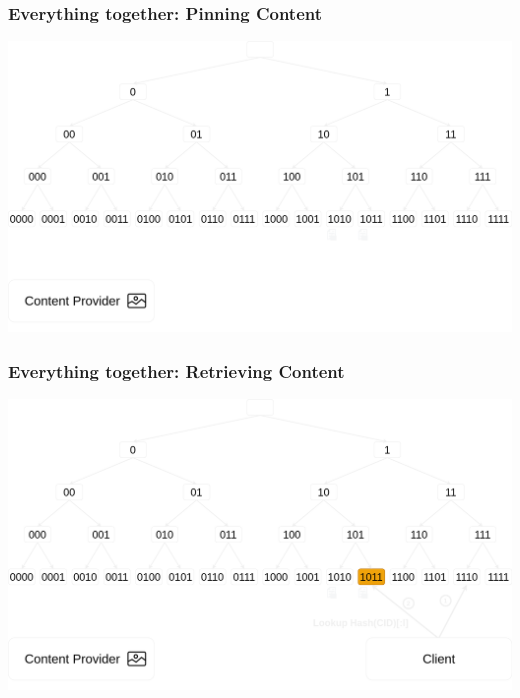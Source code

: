 \documentclass{pl-slide}
\begin{document}
\begin{frame}
\frametitle{Everything together: Pinning Content}
\begin{minipage}[b]{\linewidth}
\begin{center}
	\includegraphics[width=.8\linewidth,keepaspectratio]{resources/dht/dht-private-provider-records.png}
\end{center}
\end{minipage}
\end{frame}


\begin{frame}
\frametitle{Everything together: Retrieving Content}
\begin{minipage}[b]{\linewidth}
\begin{center}
	\includegraphics[width=.8\linewidth,keepaspectratio]{resources/dht/dht-private-client-lookup.png}
\end{center}
\end{minipage}
\end{frame}
\end{document}
